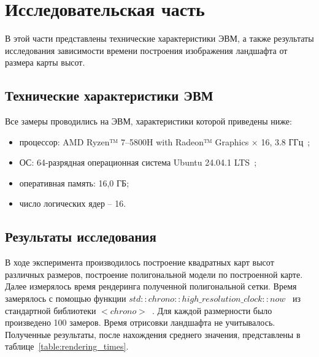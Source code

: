 \chapter{Исследовательская часть}

В этой части представлены технические характеристики ЭВМ, а также
результаты исследования зависимости времени построения изображения
ландшафта от размера карты высот.


\section{Технические характеристики ЭВМ}

Все замеры проводились на ЭВМ, характеристики которой приведены
ниже:

\begin{itemize}
    \item процессор: AMD Ryzen™ 7--5800H with Radeon™ Graphics × 16, 3.8 ГГц~\cite{radeon};
    \item ОС: 64-разрядная операционная система Ubuntu 24.04.1 LTS~\cite{ubuntu};
    \item оперативная память: 16,0 ГБ;
    \item число логических ядер -- 16.
\end{itemize}

\section{Результаты исследования}

В ходе эксперимента производилось построение квадратных карт высот
различных размеров, построение полигональной модели по построенной карте.
Далее измерялось время рендеринга полученной полигональной сетки.
Время замерялось с помощью функции $std::chrono::high\_resolution\_clock::now$~\cite{clock} из стандартной библиотеки $<chrono>$~\cite{chrono}.
Для каждой размерности было произведено 100 замеров. Время
отрисовки ландшафта не учитывалось. Полученные результаты, после нахождения среднего значения,
представлены в таблице~\ref{table:rendering_times}.

